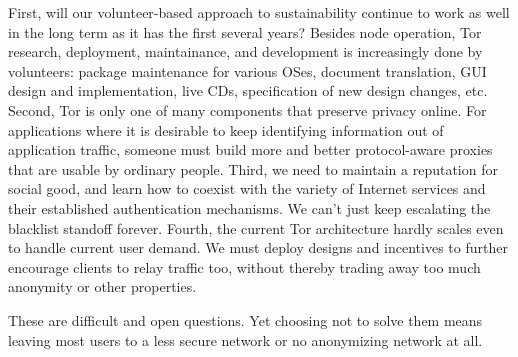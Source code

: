 \documentclass{llncs}
\begin{document}
First, will our volunteer-based approach to sustainability continue to
work as well in the long term as it has the first several years?
Besides node operation, Tor research, deployment, maintainance, and
development is increasingly done by volunteers: package maintenance
for various OSes, document translation, GUI design and implementation,
live CDs, specification of new design changes, etc.\
%
Second, Tor is only one of many components that preserve privacy
online.  For applications where it is desirable to keep identifying
information out of application traffic, someone must build more and
better protocol-aware proxies that are usable by ordinary people.
%
Third, we need to maintain a reputation for social good, and learn how to
coexist with the variety of Internet services and their established
authentication mechanisms. We can't just keep escalating the blacklist
standoff forever.
%
Fourth, the current Tor architecture hardly scales even to handle
current user demand. We must deploy designs and incentives to further
encourage clients to relay traffic too, without thereby trading away
too much anonymity or other properties.

These are difficult and open questions. Yet choosing not to solve them
means leaving most users to a less secure network or no anonymizing
network at all.

 
\end{document}
